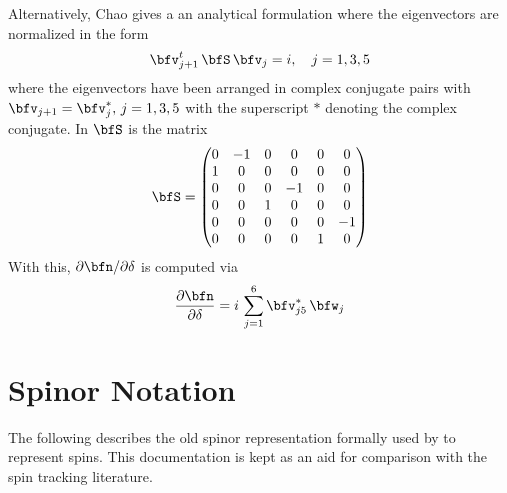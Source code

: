 {Alternatively, Chao \cite{b:chao79} gives a an analytical formulation where the eigenvectors are
normalized in the form
\begin{equation}
  \bfv_{j+1}^{t} \, \bfS \, \bfv_j = i, \quad j = 1, 3, 5
  \label{vsvi}
\end{equation}
where the eigenvectors have been arranged in complex conjugate pairs with $\bfv_{j+1} = \bfv_j^*, \,
j = 1, 3, 5$ with the superscript $*$ denoting the complex conjugate. In  $\bfS$ is the matrix
\begin{equation}
  \bfS = \begin{pmatrix}
      0 & -1 &  0 &  0 &  0 &  0 \\
      1 &  0 &  0 &  0 &  0 &  0 \\
      0 &  0 &  0 & -1 &  0 &  0 \\
      0 &  0 &  1 &  0 &  0 &  0 \\
      0 &  0 &  0 &  0 &  0 & -1 \\
      0 &  0 &  0 &  0 &  1 &  0 \\
  \end{pmatrix}
\end{equation}
With this, ${\partial \bfn}/{\partial \delta}$ is computed via
\begin{equation}
  \frac{\partial \bfn}{\partial \delta} = i \, \sum_{j = 1}^6 \bfv_{j5}^* \, \bfw_j
  \label{ndivw}
\end{equation}

\section{Spinor Notation}

The following describes the old spinor representation formally used by \bmad to represent
spins. This documentation is kept as an aid for comparison with the spin tracking literature.

}
